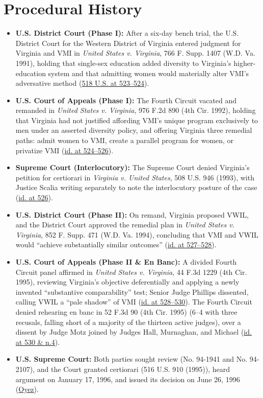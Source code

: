 \documentclass[12pt]{article}
\begin{document}
\section{Procedural History}
\begin{itemize}
\item \textbf{U.S. District Court (Phase I):} After a six-day bench trial, the U.S. District Court for the Western District of Virginia entered judgment for Virginia and VMI in \textit{United States v. Virginia}, 766 F. Supp. 1407 (W.D. Va. 1991), holding that single-sex education added diversity to Virginia's higher-education system and that admitting women would materially alter VMI's adversative method (\href{https://supreme.justia.com/cases/federal/us/518/515/}{518 U.S. at 523--524}).
\item \textbf{U.S. Court of Appeals (Phase I):} The Fourth Circuit vacated and remanded in \textit{United States v. Virginia}, 976 F.2d 890 (4th Cir. 1992), holding that Virginia had not justified affording VMI's unique program exclusively to men under an asserted diversity policy, and offering Virginia three remedial paths: admit women to VMI, create a parallel program for women, or privatize VMI (\href{https://supreme.justia.com/cases/federal/us/518/515/}{id. at 524--526}).
\item \textbf{Supreme Court (Interlocutory):} The Supreme Court denied Virginia's petition for certiorari in \textit{Virginia v. United States}, 508 U.S. 946 (1993), with Justice Scalia writing separately to note the interlocutory posture of the case (\href{https://supreme.justia.com/cases/federal/us/518/515/}{id. at 526}).
\item \textbf{U.S. District Court (Phase II):} On remand, Virginia proposed VWIL, and the District Court approved the remedial plan in \textit{United States v. Virginia}, 852 F. Supp. 471 (W.D. Va. 1994), concluding that VMI and VWIL would ``achieve substantially similar outcomes'' (\href{https://supreme.justia.com/cases/federal/us/518/515/}{id. at 527--528}).
\item \textbf{U.S. Court of Appeals (Phase II \& En Banc):} A divided Fourth Circuit panel affirmed in \textit{United States v. Virginia}, 44 F.3d 1229 (4th Cir. 1995), reviewing Virginia's objective deferentially and applying a newly invented ``substantive comparability'' test; Senior Judge Phillips dissented, calling VWIL a ``pale shadow'' of VMI (\href{https://supreme.justia.com/cases/federal/us/518/515/}{id. at 528--530}). The Fourth Circuit denied rehearing en banc in 52 F.3d 90 (4th Cir. 1995) (6--4 with three recusals, falling short of a majority of the thirteen active judges), over a dissent by Judge Motz joined by Judges Hall, Murnaghan, and Michael (\href{https://supreme.justia.com/cases/federal/us/518/515/}{id. at 530 \& n.4}).
\item \textbf{U.S. Supreme Court:} Both parties sought review (No. 94-1941 and No. 94-2107), and the Court granted certiorari (516 U.S. 910 (1995)), heard argument on January 17, 1996, and issued its decision on June 26, 1996 (\href{https://www.oyez.org/cases/1995/94-1941}{Oyez}).
\end{itemize}
\end{document}
